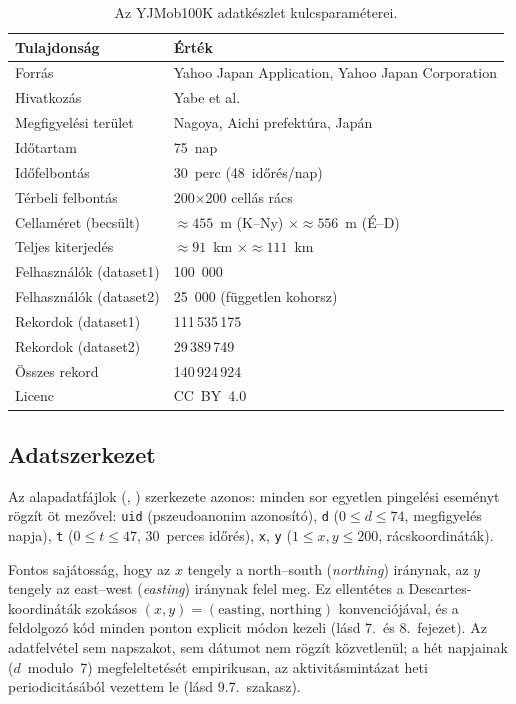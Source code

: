 \begin{table}[H]
\centering
\caption{Az YJMob100K adatkészlet kulcsparaméterei.}
\label{tab:yjmob_summary}
\begin{tabular}{l l}
\hline
\textbf{Tulajdonság} & \textbf{Érték} \\
\hline
Forrás                  & Yahoo Japan Application, Yahoo Japan Corporation \\
Hivatkozás              & Yabe et al.\ \cite{yabe2023metropolitan} \\
Megfigyelési terület    & Nagoya, Aichi prefektúra, Japán \\
Időtartam               & 75~nap \\
Időfelbontás            & 30~perc (48~időrés/nap) \\
Térbeli felbontás       & 200$\times$200 cellás rács \\
Cellaméret (becsült)    & $\approx 455$~m (K--Ny) $\times \approx 556$~m (É--D) \\
Teljes kiterjedés       & $\approx 91$~km $\times \approx 111$~km \\
Felhasználók (dataset1) & 100~000 \\
Felhasználók (dataset2) & 25~000 (független kohorsz) \\
Rekordok (dataset1)     & 111\,535\,175 \\
Rekordok (dataset2)     &  29\,389\,749 \\
Összes rekord           & 140\,924\,924 \\
Licenc                  & CC~BY~4.0 \\
\hline
\end{tabular}
\end{table}

\subsection{Adatszerkezet}

Az alapadatfájlok (, ) szerkezete azonos: minden sor egyetlen pingelési eseményt rögzít öt mezővel: \texttt{uid} (pszeudoanonim azonosító), \texttt{d} ($0\le d\le74$, megfigyelés napja), \texttt{t} ($0\le t\le47$, 30~perces időrés), \texttt{x}, \texttt{y} ($1\le x,y\le200$, rácskoordináták).

Fontos sajátosság, hogy az $x$ tengely a north--south (\textit{northing}) iránynak, az $y$ tengely az east--west (\textit{easting}) iránynak felel meg. Ez ellentétes a Descartes-koordináták szokásos $(x, y) = (\text{easting, northing})$ konvenciójával, és a feldolgozó kód minden ponton explicit módon kezeli (lásd 7.\ és 8.\ fejezet). Az adatfelvétel sem napszakot, sem dátumot nem rögzít közvetlenül; a hét napjainak ($d$~modulo~7) megfeleltetését empirikusan, az aktivitásmintázat heti periodicitásából vezettem le (lásd 9.7.\ szakasz).


